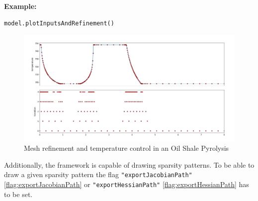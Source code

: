 \documentclass[12pt]{article}
\begin{document}
\begin{mdframed}[backgroundcolor=gray!10, roundcorner=10pt,
		linewidth=1pt]
	\textbf{Example:}
\begin{lstlisting}
model.plotInputsAndRefinement()
\end{lstlisting}
\begin{figure}[H]
	\centering
	\includegraphics[width=1\textwidth]{images/refinement.png}
	\caption{Mesh refinement and temperature control in an Oil Shale Pyrolysis}
	\label{fig:osp}
\end{figure}
\end{mdframed}

Additionally, the framework is capable of drawing sparsity patterns. To be able to draw a given sparsity pattern the flag \texttt{"exportJacobianPath"} \eqref{flag:exportJacobianPath} or \texttt{"exportHessianPath"} \eqref{flag:exportHessianPath} has to be set.
\end{document}
